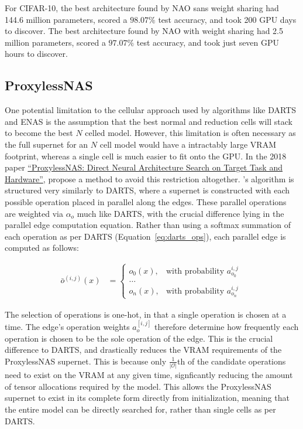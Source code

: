 For CIFAR-10, the best architecture found by NAO sans weight sharing had 144.6 million parameters,
scored a $98.07\%$ test accuracy, and took 200 GPU days to discover. The best architecture found by NAO with weight sharing
had 2.5 million parameters, scored a $97.07\%$ test accuracy, and took just seven GPU hours to discover.

\subsection{ProxylessNAS}
One potential limitation to the cellular approach used by algorithms like DARTS and ENAS is the assumption that the best
normal and reduction cells will stack to become the best $N$ celled model. However, this limitation is often necessary
as the full supernet for an $N$ cell model would have a intractably large VRAM footprint, whereas a single cell is much
easier to fit onto the GPU. In the 2018 paper
\hyperlink{cite.cai2018}{``ProxylessNAS: Direct Neural Architecture Search on Target Task and Hardware''}, \citeauthor{cai2018}
propose a method to avoid this restriction altogether. \citeauthor{cai2018}'s algorithm is structured very similarly to DARTS,
where a supernet is constructed with each possible operation placed in parallel along the edges. These parallel operations
are weighted via $\alpha_o$ much like DARTS, with the crucial difference lying in the parallel edge computation equation.
Rather than using a softmax summation of each operation as per DARTS (Equation~\ref{eq:darts_ops}),
each parallel edge is computed as follows:

\begin{align}
    \bar{o}^{(i,j)}(x) &=
        \begin{cases}
            o_0(x), &  \text{with probability } a_{o_0}^{i,j} \\
            \dots\\
            o_n(x), &  \text{with probability } a_{o_n}^{i,j}
        \end{cases}~\label{eq:proxyless}
\end{align}

\noindent The selection of operations is one-hot, in that a single operation is chosen at a time. The edge's
operation weights $a_o^[i,j]$ therefore determine how frequently each operation is chosen to be the sole operation
of the edge. This is the crucial difference to DARTS, and drastically reduces the VRAM requirements of the ProxylessNAS
supernet. This is because only $\frac{1}{\lvert \mathcal{O} \rvert}$th of the candidate operations need to exist on the
VRAM at any given time, signficantly reducing the amount of tensor allocations required by the model. This allows the
ProxylessNAS supernet to exist in its complete form directly from initialization, meaning that the entire model
can be directly searched for, rather than single cells as per DARTS.

